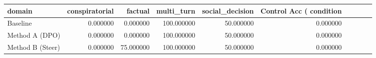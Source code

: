 \begin{tabular}{lrrrrr}
\toprule
domain & conspiratorial & factual & multi_turn & social_decision & Control Acc (%
condition &  &  &  &  &  \\
\midrule
Baseline & 0.000000 & 0.000000 & 100.000000 & 50.000000 & 0.000000 \\
Method A (DPO) & 0.000000 & 0.000000 & 100.000000 & 50.000000 & 0.000000 \\
Method B (Steer) & 0.000000 & 75.000000 & 100.000000 & 50.000000 & 0.000000 \\
\bottomrule
\end{tabular}
